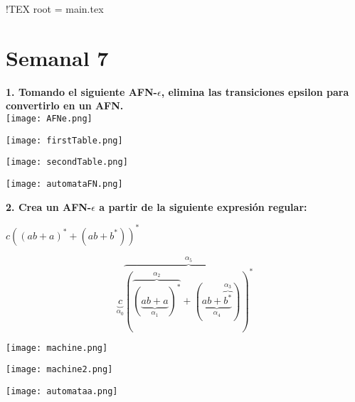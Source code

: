 !TEX root = main.tex
\renewcommand{\labelenumi}{\alph{enumi})}
\section*{Semanal 7}
\textbf{1. Tomando el siguiente AFN-$\epsilon$, elimina las transiciones epsilon para convertirlo en un AFN.}
\\ 
\texttt{[image: AFNe.png]}

\begin{center}
    \texttt{[image: firstTable.png]}

\texttt{[image: secondTable.png]}

\texttt{[image: automataFN.png]}
\end{center}

\textbf{2. Crea un AFN-$\epsilon$ a partir de la siguiente expresi\'on regular:}

\begin{center}
    $c((ab + a)^{*} + (ab + b^{*}))^{*}$

    \begin{equation}
        \underbrace{c}_{\alpha_{0}}\overbrace{(\overbrace{(\underbrace{ab + a}_{\alpha_{1}})^{*}}^{\alpha_{2}} + (\underbrace{ab + \overbrace{b^{*}}^{\alpha_{3}}}_{\alpha_{4}}))^{*}}^{\alpha_{5}}
    \end{equation}

    \texttt{[image: machine.png]}

    \texttt{[image: machine2.png]}

    \texttt{[image: automataa.png]}

\end{center}


